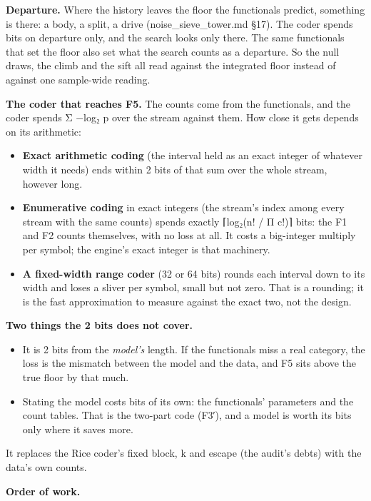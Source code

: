 \textbf{Departure.} Where the history leaves the floor the functionals predict, something is there: a body, a split, a drive (noise\_\allowbreak{}sieve\_\allowbreak{}tower.md §17). The coder spends bits on departure only, and the search looks only there. The same functionals that set the floor also set what the search counts as a departure. So the null draws, the climb and the sift all read against the integrated floor instead of against one sample-wide reading.

\textbf{The coder that reaches F5.} The counts come from the functionals, and the coder spends Σ −log₂ p over the stream against them. How close it gets depends on its arithmetic:

\begin{itemize}
\item \textbf{Exact arithmetic coding} (the interval held as an exact integer of whatever width it needs) ends within 2 bits of that sum over the whole stream, however long.
\item \textbf{Enumerative coding} in exact integers (the stream's index among every stream with the same counts) spends exactly ⌈log₂(n! / Π c!)⌉ bits: the F1 and F2 counts themselves, with no loss at all. It costs a big-integer multiply per symbol; the engine's exact integer is that machinery.
\item \textbf{A fixed-width range coder} (32 or 64 bits) rounds each interval down to its width and loses a sliver per symbol, small but not zero. That is a rounding; it is the fast approximation to measure against the exact two, not the design.
\end{itemize}

\textbf{Two things the 2 bits does not cover.}

\begin{itemize}
\item It is 2 bits from the \emph{model's} length. If the functionals miss a real category, the loss is the mismatch between the model and the data, and F5 sits above the true floor by that much.
\item Stating the model costs bits of its own: the functionals' parameters and the count tables. That is the two-part code (F3′), and a model is worth its bits only where it saves more.
\end{itemize}

It replaces the Rice coder's fixed block, k and escape (the audit's debts) with the data's own counts.

\textbf{Order of work.}

